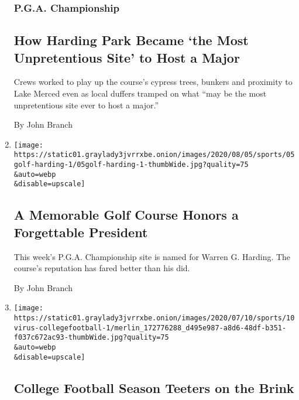 \begin{enumerate}
  \hypertarget{pga-championship-1}{%
  \subsubsection{P.G.A. Championship}\label{pga-championship-1}}

  \hypertarget{how-harding-park-became-the-most-unpretentious-site-to-host-a-major}{%
  \subsection{How Harding Park Became `the Most Unpretentious Site' to
  Host a
  Major}\label{how-harding-park-became-the-most-unpretentious-site-to-host-a-major}}

  Crews worked to play up the course's cypress trees, bunkers and
  proximity to Lake Merced even as local duffers tramped on what ``may
  be the most unpretentious site ever to host a major.''

  By John Branch
\item
  \href{/2020/08/05/sports/golf/pga-championship-harding-park.html}{}

  \texttt{[image: https://static01.graylady3jvrrxbe.onion/images/2020/08/05/sports/05golf-harding-1/05golf-harding-1-thumbWide.jpg?quality=75\\\&auto=webp\\\&disable=upscale]}

  \hypertarget{a-memorable-golf-course-honors-a-forgettable-president}{%
  \subsection{A Memorable Golf Course Honors a Forgettable
  President}\label{a-memorable-golf-course-honors-a-forgettable-president}}

  This week's P.G.A. Championship site is named for Warren G. Harding.
  The course's reputation has fared better than his did.

  By John Branch
\item
  \href{/2020/07/10/sports/ncaafootball/coronavirus-college-football-season-canceled.html}{}

  \texttt{[image: https://static01.graylady3jvrrxbe.onion/images/2020/07/10/sports/10virus-collegefootball-1/merlin\_172776288\_d495e987-a8d6-48df-b351-f037c672ac93-thumbWide.jpg?quality=75\\\&auto=webp\\\&disable=upscale]}

  \hypertarget{college-football-season-teeters-on-the-brink}{%
  \subsection{College Football Season Teeters on the
  Brink}\label{college-football-season-teeters-on-the-brink}}


\end{enumerate}
